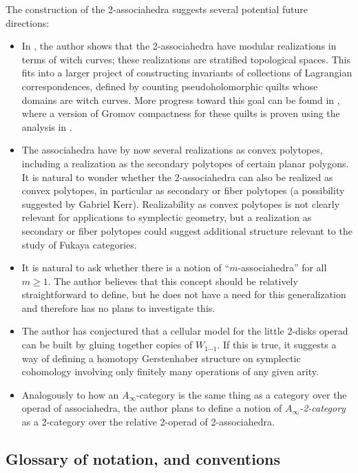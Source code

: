 \documentclass[11pt]{amsart}
\theoremstyle{definition}
\theoremstyle{remark}
\theoremstyle{plain}
\begin{document}
The construction of the 2-associahedra suggests several potential future directions:
\begin{itemize}
\item In
\cite{b:realization}, the author
shows
that the 2-associahedra have modular realizations in terms of witch curves; these realizations are stratified topological spaces.
This fits into a larger project of constructing invariants of collections of Lagrangian correspondences, defined by counting pseudoholomorphic quilts whose domains are witch curves.
More progress toward this goal can be found in \cite{bw:compactness}, where a version of Gromov compactness for these quilts is proven using the analysis in \cite{b:sing}.

\item The associahedra have by now several realizations as convex polytopes, including a realization as the secondary polytopes of certain planar polygons.
It is natural to wonder whether the 2-associahedra can also be realized as convex polytopes, in particular as secondary or fiber polytopes (a possibility suggested by Gabriel Kerr).
Realizability as convex polytopes is not clearly relevant for applications to symplectic geometry, but a realization as secondary or fiber polytopes could suggest additional structure relevant to the study of Fukaya categories.

\item It is natural to ask whether there is a notion of ``$m$-associahedra'' for all $m \geq 1$.
The author believes that this concept should be relatively straightforward to define, but he does not have a need for this generalization and therefore has no plans to investigate this.

\item The author has conjectured that a cellular model for the little 2-disks operad can be built by gluing together copies of $W_{1\cdots 1}$.
If this is true, it suggests a way of defining a homotopy Gerstenhaber structure on symplectic cohomology involving only finitely many operations of any given arity.

\item Analogously to how an $A_\infty$-category is the same thing as a category over the operad of associahedra, the author plans to define a notion of {\it $A_\infty$-2-category} as a 2-category over the relative 2-operad of 2-associahedra.
\end{itemize}

\subsection{Glossary of notation, and conventions}
\label{ss:notation_and_conventions}
\end{document}
